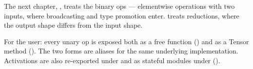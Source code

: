 The next chapter, , treats the binary
ops --- elementwise operations with two inputs, where broadcasting
and type promotion enter.  treats reductions,
where the output shape differs from the input shape.

\begin{lucidnote}
For the user: every unary op is exposed both as a free function
() and as a Tensor method
(). The two forms are aliases for the same
underlying implementation. Activations are also re-exported under
 and as stateful modules under
 ().
\end{lucidnote}

